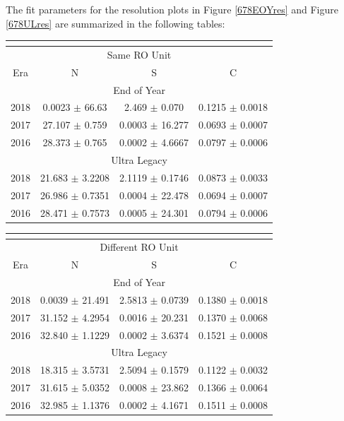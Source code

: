 The fit parameters for the resolution plots in Figure \ref{678EOYres} and Figure \ref{678ULres} are summarized in the following tables:

\begin{center}
 \begin{tabular}{ |c|c|c|c| }
 \multicolumn{4}{c}{                            } \\
 \hline
 \multicolumn{4}{|c|}{Same RO Unit}\\
 \hline
 Era & N & S & C \\
 \hline
 \hline
 \multicolumn{4}{|c|}{End of Year}\\
 \hline
 2018 & 0.0023 $\pm$ 66.63 & 2.469 $\pm$ 0.070 & 0.1215 $\pm$ 0.0018 \\
 2017 & 27.107 $\pm$ 0.759 & 0.0003 $\pm$ 16.277 & 0.0693 $\pm$ 0.0007 \\
 2016 & 28.373 $\pm$ 0.765 & 0.0002 $\pm$ 4.6667 & 0.0797 $\pm$ 0.0006 \\
 \hline
 \multicolumn{4}{|c|}{Ultra Legacy}\\
 \hline
 2018 & 21.683 $\pm$ 3.2208 & 2.1119 $\pm$ 0.1746 & 0.0873 $\pm$ 0.0033 \\
 2017 & 26.986 $\pm$ 0.7351 & 0.0004 $\pm$ 22.478 & 0.0694 $\pm$ 0.0007 \\
 2016 & 28.471 $\pm$ 0.7573 & 0.0005 $\pm$ 24.301 & 0.0794 $\pm$ 0.0006 \\
 \hline
 \end{tabular}
\end{center}
 
 \begin{center}
 \begin{tabular}{ |c|c|c|c| }
 \multicolumn{4}{c}{                            } \\
 \hline
  \multicolumn{4}{|c|}{Different RO Unit}\\
 \hline
 Era & N & S & C \\
 \hline
 \multicolumn{4}{|c|}{End of Year}\\
 \hline
 2018 & 0.0039 $\pm$ 21.491 & 2.5813 $\pm$ 0.0739 & 0.1380 $\pm$ 0.0018 \\
 2017 & 31.152 $\pm$ 4.2954 & 0.0016 $\pm$ 20.231 & 0.1370 $\pm$ 0.0068 \\
 2016 & 32.840 $\pm$ 1.1229 & 0.0002 $\pm$ 3.6374 & 0.1521 $\pm$ 0.0008 \\
 \hline
 \multicolumn{4}{|c|}{Ultra Legacy}\\
 \hline
 2018 & 18.315 $\pm$ 3.5731 & 2.5094 $\pm$ 0.1579 & 0.1122 $\pm$ 0.0032 \\
 2017 & 31.615 $\pm$ 5.0352 & 0.0008 $\pm$ 23.862 & 0.1366 $\pm$ 0.0064 \\
 2016 & 32.985 $\pm$ 1.1376 & 0.0002 $\pm$ 4.1671 & 0.1511 $\pm$ 0.0008 \\
 \hline
\end{tabular}
\end{center}

